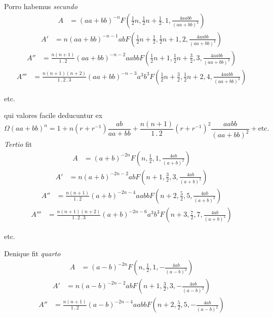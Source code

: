 Porro habemus \textit{secundo}
\[
\begin{array}{rl}
A&=(aa+bb)^{-n}F(\frac12 n,\frac12 n+\frac12 .\,1,\frac{4aabb}{(aa+bb)^2})
\end{array}
\]
\[
\begin{array}{rl}
A'&=n(aa+bb)^{-n-1}abF(\frac12 n+\frac12,\frac12 n+1,2,\frac{4aabb}{(aa+bb)^2})
\end{array}
\]
\[
\begin{array}{rl}
A''&=\frac{n(n+1)}{1\mathbin{.}2}(aa+bb)^{-n-2}aabbF(\frac12 n+1,\frac12 n+\frac32,3,\frac{4aabb}{(aa+bb)^2})
\end{array}
\]
\[
\begin{array}{rl}
A'''&=\frac{n(n+1)(n+2)}{1\mathbin{.}2\mathbin{.}3}(aa+bb)^{-n-3}a^3b^3F(\frac12 n+\frac32,\frac12 n+2,4,\frac{4aabb}{(aa+bb)^2})
\end{array}
\]
\begin{center}etc.\end{center}
qui valores facile deducuntur ex
\[
\Omega(aa+bb)^n=1+n(r+r^{-1})\frac{ab}{aa+bb}+\frac{n(n+1)}{1\mathbin{.}2}(r+r^{-1})^2\frac{aabb}{(aa+bb)^2}+\mathrm{etc.}
\]
\textit{Tertio} fit
\[
\begin{array}{rl}
A&=(a+b)^{-2n}F(n,\frac12,1,\frac{4ab}{(a+b)^2})
\end{array}
\]
\[
\begin{array}{rl}
A'&=n(a+b)^{-2n-2}abF(n+1,\frac32,3,\frac{4ab}{(a+b)^2})
\end{array}
\]
\[
\begin{array}{rl}
A''&=\frac{n(n+1)}{1\mathbin{.}2}(a+b)^{-2n-4}aabbF(n+2,\frac52,5,\frac{4ab}{(a+b)^2})
\end{array}
\]
\[
\begin{array}{rl}
A'''&=\frac{n(n+1)(n+2)}{1\mathbin{.}2\mathbin{.}3}(a+b)^{-2n-6}a^3b^3F(n+3,\frac72,7,\frac{4ab}{(a+b)^2})
\end{array}
\]
\begin{center}etc.\end{center}
Denique fit \textit{quarto}
\[
\begin{array}{rl}
A&=(a-b)^{-2n}F(n,\frac12,1,-\frac{4ab}{(a-b)^2})
\end{array}
\]
\[
\begin{array}{rl}
A'&=n(a-b)^{-2n-2}abF(n+1,\frac32,3,-\frac{4ab}{(a-b)^2})
\end{array}
\]
\[
\begin{array}{rl}
A''&=\frac{n(n+1)}{1\mathbin{.}2}(a-b)^{-2n-4}aabbF(n+2,\frac52,5,-\frac{4ab}{(a-b)^2})
\end{array}
\]
